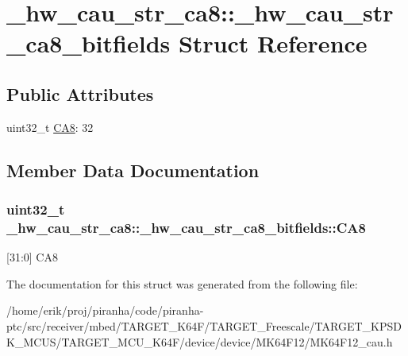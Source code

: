\hypertarget{struct__hw__cau__str__ca8_1_1__hw__cau__str__ca8__bitfields}{}\section{\+\_\+hw\+\_\+cau\+\_\+str\+\_\+ca8\+:\+:\+\_\+hw\+\_\+cau\+\_\+str\+\_\+ca8\+\_\+bitfields Struct Reference}
\label{struct__hw__cau__str__ca8_1_1__hw__cau__str__ca8__bitfields}
\subsection*{Public Attributes}
\begin{DoxyCompactItemize}
\item 
uint32\+\_\+t \hyperlink{struct__hw__cau__str__ca8_1_1__hw__cau__str__ca8__bitfields_a21423bf05d8fada3d66b5580942de76a}{C\+A8}\+: 32
\end{DoxyCompactItemize}


\subsection{Member Data Documentation}
\subsubsection[{\texorpdfstring{C\+A8}{CA8}}]{\setlength{\rightskip}{0pt plus 5cm}uint32\+\_\+t \+\_\+hw\+\_\+cau\+\_\+str\+\_\+ca8\+::\+\_\+hw\+\_\+cau\+\_\+str\+\_\+ca8\+\_\+bitfields\+::\+C\+A8}\hypertarget{struct__hw__cau__str__ca8_1_1__hw__cau__str__ca8__bitfields_a21423bf05d8fada3d66b5580942de76a}{}\label{struct__hw__cau__str__ca8_1_1__hw__cau__str__ca8__bitfields_a21423bf05d8fada3d66b5580942de76a}
\mbox{[}31\+:0\mbox{]} C\+A8 

The documentation for this struct was generated from the following file\+:\begin{DoxyCompactItemize}
\item 
/home/erik/proj/piranha/code/piranha-\/ptc/src/receiver/mbed/\+T\+A\+R\+G\+E\+T\+\_\+\+K64\+F/\+T\+A\+R\+G\+E\+T\+\_\+\+Freescale/\+T\+A\+R\+G\+E\+T\+\_\+\+K\+P\+S\+D\+K\+\_\+\+M\+C\+U\+S/\+T\+A\+R\+G\+E\+T\+\_\+\+M\+C\+U\+\_\+\+K64\+F/device/device/\+M\+K64\+F12/M\+K64\+F12\+\_\+cau.\+h\end{DoxyCompactItemize}

